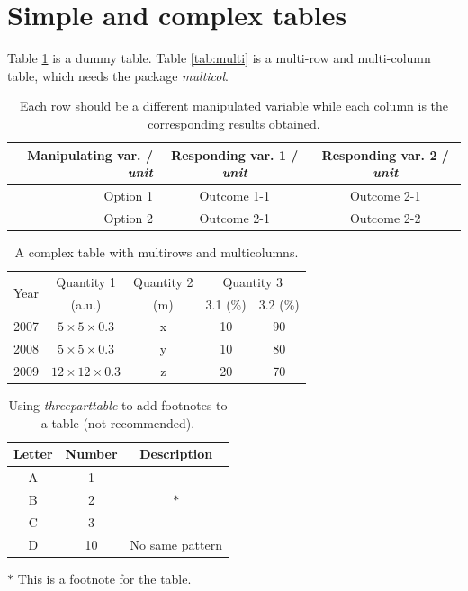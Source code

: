 \section{Simple and complex tables}
Table \ref{tab:example} is a dummy table. Table \ref{tab:multi} is a multi-row and multi-column table, which needs the package \textit{multicol}. 

\begin{table}[!h]
    \centering
    \caption{Each row should be a different manipulated variable while each column is the corresponding results obtained.}
    \begin{tabular}{r|c c}
        Manipulating var. / \textit{unit} & Responding var. 1 / \textit{unit} & Responding var. 2 / \textit{unit} \\
        \hline
        Option 1 & Outcome 1-1 & Outcome 2-1 \\
        Option 2 & Outcome 2-1 & Outcome 2-2 \\
    \end{tabular}
    \label{tab:example}
\end{table}

\begin{table}[!h]
  \caption{A complex table with multirows and multicolumns.}
  \centering
    \begin{tabular}{c|c c c c}
    \hline 
    \multirow{2}{*}{Year} & Quantity 1 & Quantity 2 & \multicolumn{2}{c}{Quantity 3} \\
        & (a.u.) & (m) & 3.1 (\%) & 3.2 (\%) \\ 
    \hline 
    2007 & $5\times5\times0.3$ & x & 10 & 90 \\
    2008 & $5\times5\times0.3$ & y & 10 & 80 \\
    2009 & $12\times12\times0.3$ & z & 20 & 70\\[0.8ex]
    \hline
    \end{tabular}
  \label{tab:LSCConfig}
\end{table}

\begin{table}[!htbp]
\caption{Using \textit{threeparttable} to add footnotes to a table (not recommended).}
  \begin{center}
  \begin{threeparttable}
    \begin{tabular}{c c c}
    \hline
    Letter & Number & Description \\
    \hline
    A & 1 & \multirow{3}{*}{\(\ast\)} \\
    B & 2 & \\
    C & 3 & \\
    D & 10 & No same pattern \\
    \hline
    \end{tabular}
    \begin{tablenotes}
    \(\ast\) This is a footnote for the table. 
    \end{tablenotes}
  \end{threeparttable}
  \end{center}
  \label{tab:dye}
\end{table}

